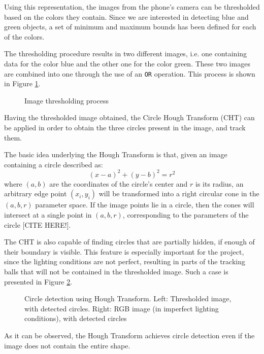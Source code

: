 \documentclass[journal]{IEEEtran}
\let\MYoriglatexcaption\caption
\renewcommand{\caption}[2][\relax]{\MYoriglatexcaption[#2]{#2}}
\begin{document}
Using this representation, the images from the phone's camera can be thresholded based on the colors they contain. Since we are interested in detecting blue and green objects, a set of minimum and maximum bounds has been defined for each of the colors.

The thresholding procedure results in two different images, i.e. one containing data for the color blue and the other one for the color green. These two images are combined into one through the use of an \texttt{OR} operation. This process is shown in Figure \ref{fig:thresh}.
\begin{figure}[!htpb]
\centering
\caption{Image thresholding process}
\label{fig:thresh}
\end{figure}

Having the thresholded image obtained, the Circle Hough Transform (CHT) can be applied in order to obtain the three circles present in the image, and track them.

The basic idea underlying the Hough Transform is that, given an image containing a circle described as:
\begin{equation}
\left(x-a\right)^2 + \left(y-b\right)^2 = r^2
\end{equation}
where $(a,b)$ are the coordinates of the circle's center and $r$ is its radius, an arbitrary edge point $(x_i, y_i)$ will be transformed into a right circular cone in the $(a,b,r)$ parameter space. If the image points lie in a circle, then the cones will intersect at a single point in $(a,b,r)$, corresponding to the parameters of the circle [CITE HERE!].

The CHT is also capable of finding circles that are partially hidden, if enough of their boundary is visible. This feature is especially important for the project, since the lighting conditions are not perfect, resulting in parts of the tracking balls that will not be contained in the thresholded image. Such a case is presented in Figure \ref{fig:cht}.
\begin{figure}[!htpb]
\centering
\caption{Circle detection using Hough Transform. Left: Thresholded image, with detected circles. Right: RGB image (in imperfect lighting conditions), with detected circles}
\label{fig:cht}
\end{figure}

As it can be observed, the Hough Transform achieves circle detection even if the image does not contain the entire shape.
\end{document}
